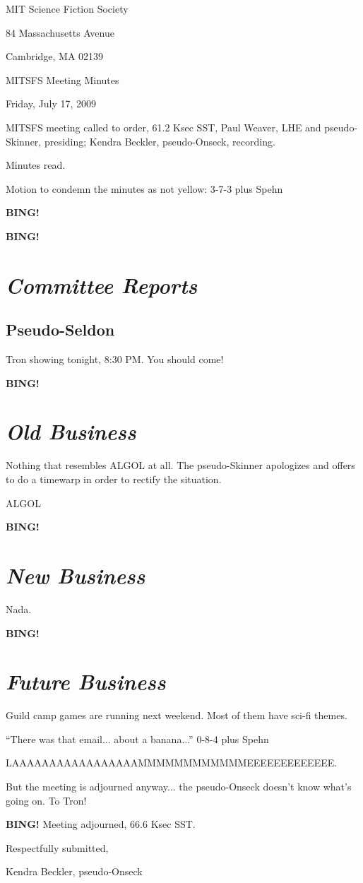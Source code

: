 \documentclass[10pt]{article}
\newcommand{\bing}{{\bf BING!} }
\newcommand{\goto}[1]{\bing \vskip 12pt \section*{{\em{#1}}}}
\newcommand{\ps}{ plus Spehn\xspace}
\begin{document}
\begin{center}

MIT Science Fiction Society

84 Massachusetts Avenue

Cambridge, MA 02139

\vspace{12pt}

MITSFS Meeting Minutes

Friday, July 17, 2009

\end{center}

\vspace{18pt}

\setlength{\parskip}{6pt}

\noindent
MITSFS meeting called to order, 61.2 Ksec SST,
Paul Weaver, LHE and pseudo-Skinner, presiding; Kendra Beckler, pseudo-Onseck, recording.

Minutes read.

Motion to condemn the minutes as not yellow: 3-7-3 \ps

\bing

\goto{Committee Reports}

\subsection*{Pseudo-Seldon}

Tron showing tonight, 8:30 PM.  You should come!

\goto{Old Business}

Nothing that resembles ALGOL at all.  The pseudo-Skinner apologizes and offers to do a timewarp in order to rectify the situation.

ALGOL

\goto{New Business}

Nada.

\goto{Future Business}

Guild camp games are running next weekend.  Most of them have sci-fi themes.

``There was that email... about a banana...'' 0-8-4 \ps

LAAAAAAAAAAAAAAAAAMMMMMMMMMMMMEEEEEEEEEEEEE.

But the meeting is adjourned anyway... the pseudo-Onseck doesn't know what's going on.  To Tron!

\bing
\noindent
Meeting adjourned, 66.6 Ksec SST.

\vspace{18pt}

\centerline{Respectfully submitted,}
\centerline{Kendra Beckler, pseudo-Onseck}
\end{document}
